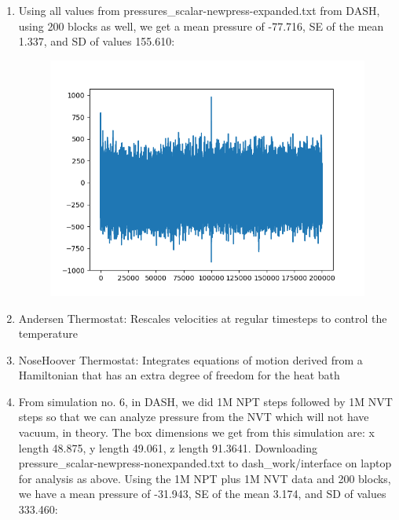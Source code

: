 \documentclass[12pt,reqno]{amsart}
\numberwithin{equation}{section}
\begin{document}
\begin{enumerate}
\begin{figure}[H]
\end{figure}
\item Using all values from pressures\_scalar-newpress-expanded.txt from DASH, using 200 blocks as well, we get a mean pressure of -77.716, SE of the mean 1.337, and SD of values 155.610:
\begin{figure}[H]
\centering
\includegraphics[scale=0.7]{pressures_newpress-expanded-full}
\end{figure}
\item Andersen Thermostat: Rescales velocities at regular timesteps to control the temperature
\item NoseHoover Thermostat: Integrates equations of motion derived from a Hamiltonian that has an extra degree of freedom for the heat bath
\item From simulation no. 6, in DASH, we did 1M NPT steps followed by 1M NVT steps so that we can analyze pressure from the NVT which will not have vacuum, in theory.  The box dimensions we get from this simulation are: x length 48.875, y length 49.061, z length 91.3641.  Downloading pressure\_scalar-newpress-nonexpanded.txt to dash\_work/interface on laptop for analysis as above.  Using the 1M NPT plus 1M NVT data and 200 blocks, we have a mean pressure of -31.943, SE of the mean 3.174, and SD of values 333.460:
\begin{figure}[H]
\centering

\end{figure}
\end{enumerate}
\end{document}
